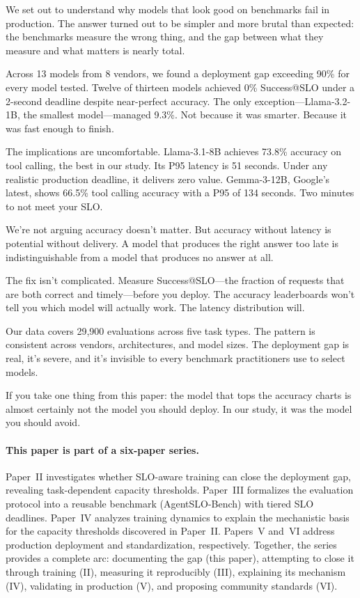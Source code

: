 \documentclass[11pt]{article}
\begin{document}
We set out to understand why models that look good on benchmarks fail in production. The answer turned out to be simpler and more brutal than expected: the benchmarks measure the wrong thing, and the gap between what they measure and what matters is nearly total.

Across 13 models from 8 vendors, we found a deployment gap exceeding 90\% for every model tested. Twelve of thirteen models achieved 0\% Success@SLO under a 2-second deadline despite near-perfect accuracy. The only exception---Llama-3.2-1B, the smallest model---managed 9.3\%. Not because it was smarter. Because it was fast enough to finish.

The implications are uncomfortable. Llama-3.1-8B achieves 73.8\% accuracy on tool calling, the best in our study. Its P95 latency is 51 seconds. Under any realistic production deadline, it delivers zero value. Gemma-3-12B, Google's latest, shows 66.5\% tool calling accuracy with a P95 of 134 seconds. Two minutes to not meet your SLO.

We're not arguing accuracy doesn't matter. But accuracy without latency is potential without delivery. A model that produces the right answer too late is indistinguishable from a model that produces no answer at all.

The fix isn't complicated. Measure Success@SLO---the fraction of requests that are both correct and timely---before you deploy. The accuracy leaderboards won't tell you which model will actually work. The latency distribution will.

Our data covers 29,900 evaluations across five task types. The pattern is consistent across vendors, architectures, and model sizes. The deployment gap is real, it's severe, and it's invisible to every benchmark practitioners use to select models.

If you take one thing from this paper: the model that tops the accuracy charts is almost certainly not the model you should deploy. In our study, it was the model you should avoid.

\paragraph{This paper is part of a six-paper series.}
Paper~II investigates whether SLO-aware training can close the deployment gap, revealing task-dependent capacity thresholds.
Paper~III formalizes the evaluation protocol into a reusable benchmark (AgentSLO-Bench) with tiered SLO deadlines.
Paper~IV analyzes training dynamics to explain the mechanistic basis for the capacity thresholds discovered in Paper~II.
Papers~V and~VI address production deployment and standardization, respectively.
Together, the series provides a complete arc: documenting the gap (this paper), attempting to close it through training (II), measuring it reproducibly (III), explaining its mechanism (IV), validating in production (V), and proposing community standards (VI).
\end{document}
